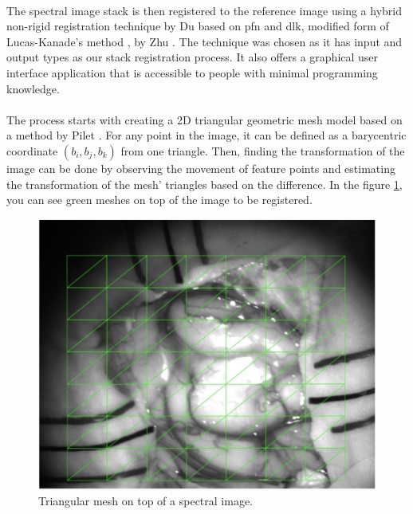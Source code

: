 \documentclass[12pt,oneside]{report}
\begin{document}
\paragraph{}
The spectral image stack is then registered to the reference image using a hybrid non-rigid registration technique by Du \etal \cite{du_robust_2015} based on \acrfull{pfn} and \acrfull{dlk}, modified form of Lucas-Kanade's method \cite{lucas_iterative_1981}, by Zhu \etal \cite{zhu_fast_2009}. The technique was chosen as it has input and output types as our stack registration process. It also offers a graphical user interface application that is accessible to people with minimal programming knowledge.

\paragraph{}
The process starts with creating a 2D triangular geometric mesh model based on a method by Pilet \etal \cite{pilet_fast_2008}. For any point in the image, it can be defined as a barycentric coordinate $(b_i, b_j, b_k)$ from one triangle. Then, finding the transformation of the image can be done by observing the movement of feature points and estimating the transformation of the mesh' triangles based on the difference. In the figure \ref{fig:pfnlk-mesh}, you can see green meshes on top of the image to be registered.

\vspace{0.2cm}
\begin{figure}[h]
\centering
\begin{minipage}[h]{0.5\textwidth}
    \centering
    \includegraphics[width=\textwidth]{figures/pfnlk-mesh.png}
    \caption{Triangular mesh on top of a spectral image.}
    \label{fig:pfnlk-mesh}
\end{minipage}
\end{figure}
\end{document}

